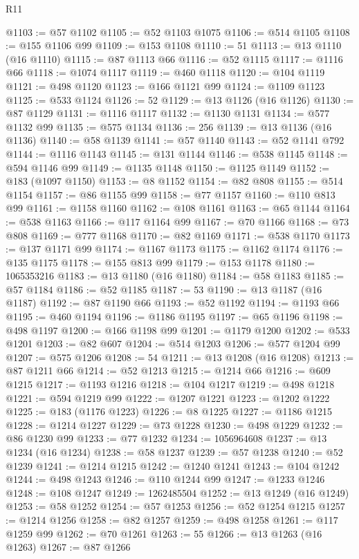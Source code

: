 \begin{lexlean}{R11}
\begin{coremodule}
@1103 := @57 @1102
@1105 := @52 @1103 @1075
@1106 := @514 @1105
@1108 := @155 @1106 @99
@1109 := @153 @1108
@1110 := 51
@1113 := @13 @1110 (@16 @1110)
@1115 := @87 @1113 @66
@1116 := @52 @1115
@1117 := @1116 @66
@1118 := @1074 @1117
@1119 := @460 @1118
@1120 := @104 @1119
@1121 := @498 @1120
@1123 := @166 @1121 @99
@1124 := @1109 @1123
@1125 := @533 @1124
@1126 := 52
@1129 := @13 @1126 (@16 @1126)
@1130 := @87 @1129
@1131 := @1116 @1117
@1132 := @1130 @1131
@1134 := @577 @1132 @99
@1135 := @575 @1134
@1136 := 256
@1139 := @13 @1136 (@16 @1136)
@1140 := @58 @1139
@1141 := @57 @1140
@1143 := @52 @1141 @792
@1144 := @1116 @1143
@1145 := @131 @1144
@1146 := @538 @1145
@1148 := @594 @1146 @99
@1149 := @1135 @1148
@1150 := @1125 @1149
@1152 := @183 (@1097 @1150)
@1153 := @8 @1152
@1154 := @82 @808
@1155 := @514 @1154
@1157 := @86 @1155 @99
@1158 := @77 @1157
@1160 := @110 @813 @99
@1161 := @1158 @1160
@1162 := @108 @1161
@1163 := @65 @1144
@1164 := @538 @1163
@1166 := @117 @1164 @99
@1167 := @70 @1166
@1168 := @73 @808
@1169 := @777 @1168
@1170 := @82 @1169
@1171 := @538 @1170
@1173 := @137 @1171 @99
@1174 := @1167 @1173
@1175 := @1162 @1174
@1176 := @135 @1175
@1178 := @155 @813 @99
@1179 := @153 @1178
@1180 := 1065353216
@1183 := @13 @1180 (@16 @1180)
@1184 := @58 @1183
@1185 := @57 @1184
@1186 := @52 @1185
@1187 := 53
@1190 := @13 @1187 (@16 @1187)
@1192 := @87 @1190 @66
@1193 := @52 @1192
@1194 := @1193 @66
@1195 := @460 @1194
@1196 := @1186 @1195
@1197 := @65 @1196
@1198 := @498 @1197
@1200 := @166 @1198 @99
@1201 := @1179 @1200
@1202 := @533 @1201
@1203 := @82 @607
@1204 := @514 @1203
@1206 := @577 @1204 @99
@1207 := @575 @1206
@1208 := 54
@1211 := @13 @1208 (@16 @1208)
@1213 := @87 @1211 @66
@1214 := @52 @1213
@1215 := @1214 @66
@1216 := @609 @1215
@1217 := @1193 @1216
@1218 := @104 @1217
@1219 := @498 @1218
@1221 := @594 @1219 @99
@1222 := @1207 @1221
@1223 := @1202 @1222
@1225 := @183 (@1176 @1223)
@1226 := @8 @1225
@1227 := @1186 @1215
@1228 := @1214 @1227
@1229 := @73 @1228
@1230 := @498 @1229
@1232 := @86 @1230 @99
@1233 := @77 @1232
@1234 := 1056964608
@1237 := @13 @1234 (@16 @1234)
@1238 := @58 @1237
@1239 := @57 @1238
@1240 := @52 @1239
@1241 := @1214 @1215
@1242 := @1240 @1241
@1243 := @104 @1242
@1244 := @498 @1243
@1246 := @110 @1244 @99
@1247 := @1233 @1246
@1248 := @108 @1247
@1249 := 1262485504
@1252 := @13 @1249 (@16 @1249)
@1253 := @58 @1252
@1254 := @57 @1253
@1256 := @52 @1254 @1215
@1257 := @1214 @1256
@1258 := @82 @1257
@1259 := @498 @1258
@1261 := @117 @1259 @99
@1262 := @70 @1261
@1263 := 55
@1266 := @13 @1263 (@16 @1263)
@1267 := @87 @1266

\end{coremodule}
\end{lexlean}
